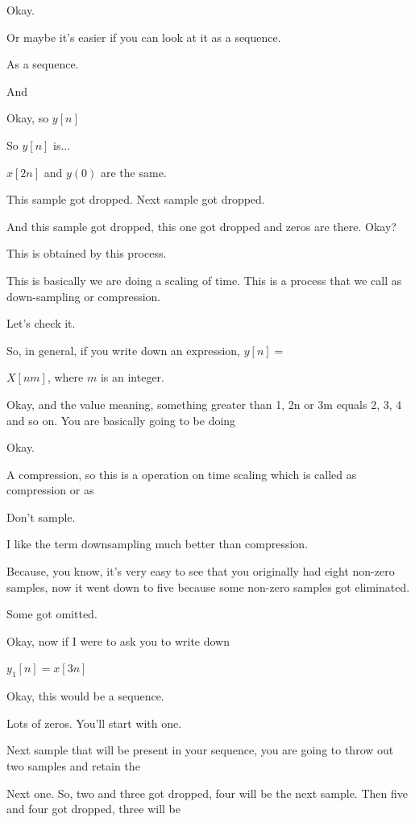 \documentclass[11pt,a4paper]{article}
\begin{document}
Okay.

Or maybe it's easier if you can look at it as a sequence.

As a sequence.

And

Okay, so $y[n]$

So $y[n]$ is...

$x[2n]$ and $y(0)$ are the same.

This sample got dropped. Next sample got dropped.

And this sample got dropped, this one got dropped and zeros are there. Okay?

This is obtained by this process.

This is basically we are doing a scaling of time. This is a process that we call as down-sampling or compression.

Let's check it.

So, in general, if you write down an expression, $y[n] =$

$X[nm]$, where $m$ is an integer.

Okay, and the value meaning, something greater than 1, 2n or 3m equals 2, 3, 4 and so on. You are basically going to be doing

Okay.

A compression, so this is a operation on time scaling which is called as compression or as

Don't sample.

I like the term downsampling much better than compression.

Because, you know, it's very easy to see that you originally had eight non-zero samples, now it went down to five because some non-zero samples got eliminated.

Some got omitted.

Okay, now if I were to ask you to write down

$y_1[n] = x[3n]$

Okay, this would be a sequence.

Lots of zeros. You'll start with one.

Next sample that will be present in your sequence, you are going to throw out two samples and retain the

Next one. So, two and three got dropped, four will be the next sample. Then five and four got dropped, three will be
\end{document}
